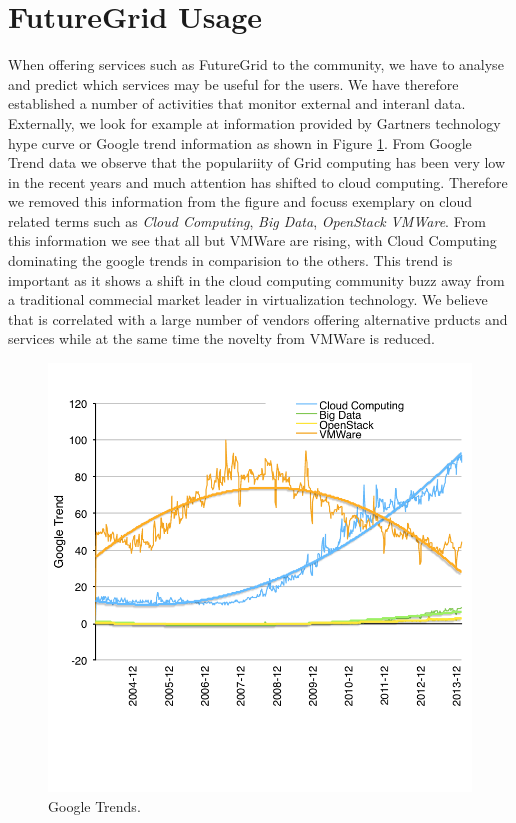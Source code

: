 
\section{FutureGrid Usage}

When offering services such as FutureGrid to the community, we have to
analyse and predict which services may be useful for the users. We
have therefore established a number of activities that monitor
external and interanl data. Externally, we look for example at
information provided by Gartners technology hype curve \cite{?} or
Google trend information as shown in Figure \ref{F:google-trend}. From
Google Trend data we observe that the populariity of Grid computing
has been very low  in the recent years and much attention has shifted
to cloud computing. Therefore we removed this information from the
figure and focuss exemplary on cloud related terms such as {\em Cloud
  Computing}, {\em Big Data}, {\em OpenStack} {\em VMWare}.
From this information we see that all but VMWare are rising, with
Cloud Computing dominating the google trends in comparision to the
others. This trend is important as it shows a shift in the cloud
computing community buzz away from a traditional commecial market
leader in virtualization technology. We believe that is correlated
with a large number of vendors offering alternative prducts and
services while at the same time the novelty from VMWare is reduced.

\begin{figure}[htb]
 \centering
    \includegraphics[width=.75\textwidth]{images/google-trend.pdf}
  \caption{Google Trends.}\label{F:google-trend}
\end{figure}

